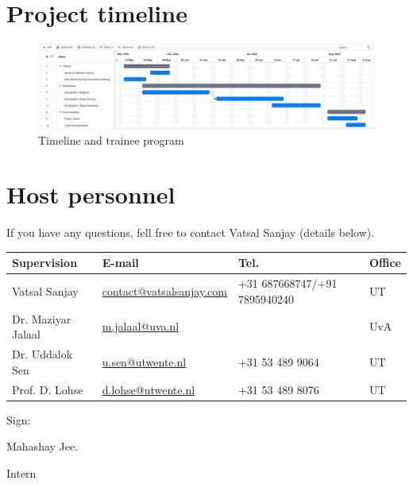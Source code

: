 \documentclass[a4paper,10pt]{article}
\begin{document}
\section*{Project timeline}
\begin{figure}[H]
	\includegraphics[width=\textwidth]{OnlineGantt2022045.pdf}
	\caption{Timeline and trainee program}
\end{figure}

\section*{Host personnel}
If you have any questions, fell free to contact  Vatsal Sanjay (details below).

\begin{center}
\begin{tabular}{|l|l|l|l|}
\hline \textbf{Supervision} & \textbf{E-mail} & \textbf{Tel.}  & \textbf{Office} \\
\hline Vatsal Sanjay & \href{mailto:contact@vatsalsanjay.com}{contact@vatsalsanjay.com} & +31 687668747/+91 7895940240 &  UT \\
\hline Dr. Maziyar Jalaal   & \href{mailto:m.jalaal@uva.nl}{m.jalaal@uva.nl}& & UvA \\
\hline Dr. Uddalok Sen   & \href{mailto:u.sen@utwente.nl}{u.sen@utwente.nl}& +31 53 489 9064  & UT \\
\hline Prof. D. Lohse & \href{mailto:d.lohse@utwente.nl}{d.lohse@utwente.nl} & +31 53 489 8076 & UT  \\
\hline
\end{tabular}
\end{center}

\pagebreak

\vspace{20mm}

\noindent Sign: \hrulefill

\hspace*{0mm}\phantom{Sign: }Mahashay Jee.

\hspace*{0mm}\phantom{Sign: }Intern

\vspace{20mm}
\end{document}
